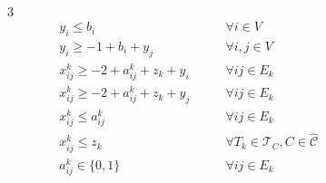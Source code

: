 \begin{alignat}{3}
	\quad\quad
	                                           &                                                                                                                                                                       \\
	\label{eq:d-ecp-vertex-l-b}
	                                           &                                           & y_i \leq b_i \quad\quad                                                       & \forall i \in V                           \\
	\label{eq:d-ecp-vertex-g-bi-yj}
	                                           &                                           & y_i \geq -1 + b_i + y_j \quad\quad                                            & \forall i,j \in V                         \\
	\label{eq:d-ecp-x-l-sum1}
	                                           &
	                                           & x_{ij}^{k} \geq -2 +
	a_{ij} ^{k} + z_k + y_i \quad\quad         & \forall ij \in E_k                                                                                                                                                    \\
	\label{eq:d-ecp-x-l-sum2}
	                                           &
	                                           & x_{ij}^{k} \geq -2 +
	a_{ij} ^{k} + z_k + y_j \quad\quad         & \forall ij \in E_k                                                                                                                                                    \\
	\label{eq:d-ecp-x-l-a}
	                                           &                                           & x_{ij} ^{k} \leq a_{ij} ^{k} \quad\quad                                       & \forall ij \in E_k                        \\
	\label{eq:d-ecp-x-l-z}
	                                           &                                           & x_{ij} ^{k} \leq z_k \quad\quad                                               & \forall T_{k} \in \mathcal{T} _{C}, C \in
	\hat{\mathcal{C}}                                                                                                                                                                                                  \\
	\label{eq:d-ecp-a-ij}
	                                           &                                           & a _{ij} ^{k}  \in \{0, 1\} \quad\quad                                         & \forall ij \in E_k                        \\

\end{alignat}

